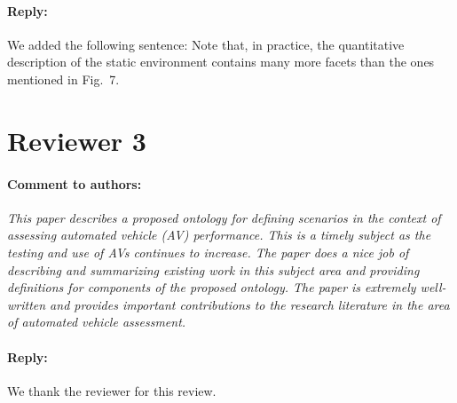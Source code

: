 \documentclass[10pt,final,a4paper,oneside,onecolumn]{article}
\newcommand{\toauthor}{\paragraph*{Comment to authors:} \itshape}
\newcommand{\fromauthor}{\paragraph*{Reply:} \normalfont}
\newcommand{\cstart}{\cbstart\color{red}}
\newcommand{\cend}{\cbend\color{black}}
\begin{document}
\fromauthor We added the following sentence: \cstart Note that, in practice, the quantitative description of the static environment contains many more facets than the ones mentioned in Fig.~7.\cend



\section*{Reviewer 3}

\toauthor This paper describes a proposed ontology for defining scenarios in the context of assessing automated vehicle (AV) performance. This is a timely subject as the testing and use of AVs continues to increase. The paper does a nice job of describing and summarizing existing work in this subject area and providing definitions for components of the proposed ontology. The paper is extremely well-written and provides important contributions to the research literature in the area of automated vehicle assessment.

\fromauthor We thank the reviewer for this review.



\printbibliography
\end{document}
